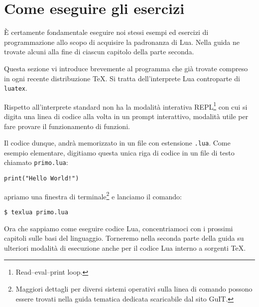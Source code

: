 

\chapter{Come eseguire gli esercizi}

È certamente fondamentale eseguire noi stessi esempi ed esercizi di
programmazione allo scopo di acquisire la padronanza di Lua. Nella guida ne
trovate alcuni alla fine di ciascun capitolo della parte seconda. 

Questa sezione vi introduce brevemente al programma  che già
trovate compreso in ogni recente distribuzione \TeX{}. Si tratta dell'interprete
Lua controparte di \texttt{luatex}.

Rispetto all'interprete  standard  non ha la modalità
interativa REPL\footnote{Read–eval–print loop.} con cui si digita una linea di
codice alla volta in un prompt interattivo, modalità utile per fare provare il
funzionamento di funzioni.

Il codice dunque, andrà memorizzato in un file con estensione \texttt{.lua}.
Come esempio elementare, digitiamo questa unica riga di codice in un file
di testo chiamato \texttt{primo.lua}:
\begin{Verbatim}
print("Hello World!")
\end{Verbatim}
apriamo una finestra di terminale\footnote{Maggiori dettagli per diversi sistemi
operativi sulla linea di comando possono essere trovati nella guida tematica
dedicata scaricabile dal sito GuIT.} e lanciamo il comando:
\begin{Verbatim}
$ texlua primo.lua
\end{Verbatim}

Ora che sappiamo come eseguire codice Lua, concentriamoci con i prossimi
capitoli sulle basi del linguaggio. Torneremo nella seconda parte della guida su
ulteriori modalità di esecuzione anche per il codice Lua interno a sorgenti \TeX.


